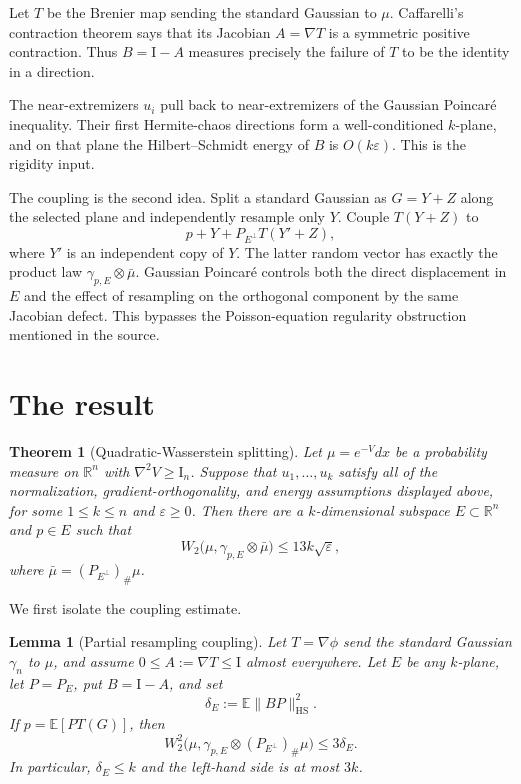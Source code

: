 \documentclass[11pt]{article}
\newtheorem{theorem}{Theorem}
\newtheorem{lemma}{Lemma}
\newcommand{\R}{\mathbb R}
\newcommand{\E}{\mathbb E}
\newcommand{\Id}{\mathrm I}
\newcommand{\HS}{\mathrm{HS}}
\begin{document}
Let $T$ be the Brenier map sending the standard Gaussian to $\mu$.
Caffarelli's contraction theorem says that its Jacobian $A=\nabla T$ is a
symmetric positive contraction.  Thus $B=\Id-A$ measures precisely the
failure of $T$ to be the identity in a direction.

The near-extremizers $u_i$ pull back to near-extremizers of the Gaussian
Poincar\'e inequality.  Their first Hermite-chaos directions form a
well-conditioned $k$-plane, and on that plane the Hilbert--Schmidt energy of
$B$ is $O(k\varepsilon)$.  This is the rigidity input.

The coupling is the second idea.  Split a standard Gaussian as $G=Y+Z$ along
the selected plane and independently resample only $Y$.  Couple
$T(Y+Z)$ to
\[
 p+Y+P_{E^\perp}T(Y'+Z),
\]
where $Y'$ is an independent copy of $Y$.  The latter random vector has
exactly the product law $\gamma_{p,E}\otimes\bar\mu$.  Gaussian Poincar\'e
controls both the direct displacement in $E$ and the effect of resampling on
the orthogonal component by the same Jacobian defect.  This bypasses the
Poisson-equation regularity obstruction mentioned in the source.

\section{The result}

\begin{theorem}[Quadratic-Wasserstein splitting]
Let $\mu=e^{-V}dx$ be a probability measure on $\R^n$ with
$\nabla^2V\ge\Id_n$.  Suppose that $u_1,\ldots,u_k$ satisfy all of the
normalization, gradient-orthogonality, and energy assumptions displayed
above, for some $1\le k\le n$ and $\varepsilon\ge0$.  Then there are a
$k$-dimensional subspace $E\subset\R^n$ and $p\in E$ such that
\[
 W_2\bigl(\mu,\gamma_{p,E}\otimes\bar\mu\bigr)
 \le 13k\sqrt\varepsilon,
\]
where $\bar\mu=(P_{E^\perp})_\#\mu$.
\end{theorem}

We first isolate the coupling estimate.

\begin{lemma}[Partial resampling coupling]\label{lem:coupling}
Let $T=\nabla\phi$ send the standard Gaussian $\gamma_n$ to $\mu$, and assume
$0\le A:=\nabla T\le\Id$ almost everywhere.  Let $E$ be any $k$-plane, let
$P=P_E$, put $B=\Id-A$, and set
\[
 \delta_E:=\E\|BP\|_{\HS}^2.
\]
If $p=\E[PT(G)]$, then
\[
 W_2^2\bigl(\mu,\gamma_{p,E}\otimes(P_{E^\perp})_\#\mu\bigr)
 \le 3\delta_E .
\]
In particular, $\delta_E\le k$ and the left-hand side is at most $3k$.
\end{lemma}
\end{document}
